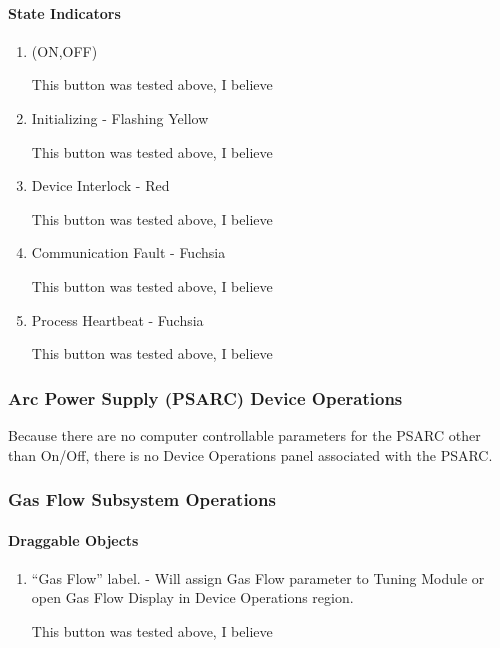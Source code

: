 \documentclass[11pt]{book}		%
\begin{document}
\paragraph{State Indicators}

\begin{enumerate}
 \item (ON,OFF)

\color{red}
This button was tested above, I believe
\color{black}

 \item Initializing - Flashing Yellow

\color{red}
This button was tested above, I believe
\color{black}

 \item Device Interlock - Red

\color{red}
This button was tested above, I believe
\color{black}

 \item Communication Fault - Fuchsia

\color{red}
This button was tested above, I believe
\color{black}

 \item Process Heartbeat - Fuchsia

\color{red}
This button was tested above, I believe
\color{black}

\end{enumerate}

\subsubsection{Arc Power Supply (PSARC) Device Operations}


Because there are no computer controllable parameters for the PSARC other than On/Off, there is no Device Operations panel associated with the PSARC.


\subsubsection{Gas Flow Subsystem Operations}

\paragraph{Draggable Objects}

\begin{enumerate}
 \item ``Gas Flow'' label. - Will assign Gas Flow parameter to Tuning Module or open Gas Flow Display in Device Operations region.

\color{red}
This button was tested above, I believe
\color{black}

\end{enumerate}
\end{document}
